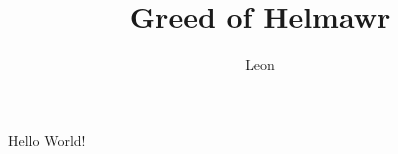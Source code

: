 \documentclass[a4paper,12pt]{article}
\title{Greed of Helmawr}
\author{Leon}
\begin{document}
    \maketitle
    \newpage

    Hello World!
\end{document}
